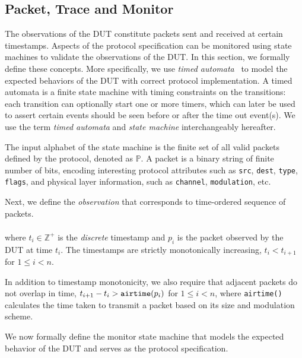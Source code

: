 \subsection{Packet, Trace and Monitor}
\label{subsec:basic}

The observations of the DUT constitute packets sent and received at certain
timestamps.
%
Aspects of the protocol specification can be monitored using state machines
to validate the observations of the DUT.
%
In this section, we formally define these concepts.
%
More specifically, we use \textit{timed automata}~\cite{alur1994theory} to model
the expected behaviors of the DUT with correct protocol implementation.
%
A timed automata is a finite state machine with timing constraints on the
transitions: each transition can optionally start one or more timers, which can
later be used to assert certain events should be seen before or after the time
out event(s).
%
We use the term \textit{timed automata} and \textit{state machine}
interchangeably hereafter.

The input alphabet of the state machine is the finite set of all valid packets defined
by the protocol, denoted as $\mathbb{P}$. 
%
A packet is a binary string of finite number of bits, encoding interesting
protocol attributes such as \texttt{src}, \texttt{dest}, \texttt{type},
\texttt{flags}, and physical layer information, such as \texttt{channel},
\texttt{modulation}, etc.

Next, we define the \textit{observation} that corresponds to time-ordered
sequence of packets.
\begin{definition}
  \begin{align*}
    [(t_1, p_1), (t_2, p_2),\ldots,(t_n, p_n)]
  \end{align*}%
  where $t_i \in \mathbb{Z}^+$ is the \textit{discrete} timestamp and $p_i$ is the packet
  observed by the DUT at time $t_i$. The timestamps are strictly monotonically increasing,
  $t_i < t_{i+1}$ for $1 \le i < n$.
\end{definition}%

In addition to timestamp monotonicity, we also require that adjacent packets do
not overlap in time, $t_{i+1}-t_i > \text{\texttt{airtime}}(p_i)$ for $1 \le i
< n$, where \texttt{airtime()} calculates the time taken to transmit a packet
based on its size and modulation scheme.

We now formally define the monitor state machine that models the expected
behavior of the DUT and serves as the protocol specification.

